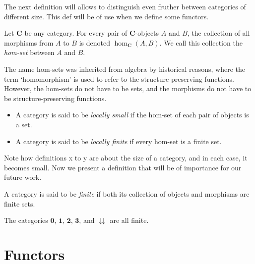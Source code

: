 The next definition will allows to distinguish even fruther between categories of different size.
This def will be of use when we define some functors.

\begin{definition}
    Let \(\mathbf{C}\) be any category.
    For every pair of \(\mathbf{C}\)-objects \(A\) and \(B\), the collection of all morphisms from \(A\) to \(B\) is denoted \(\hom_\mathbf{C}(A,B)\).
    We call this collection the  \textit{hom-set} between \(A\) and \(B\).
\end{definition}

\begin{remark}
    The name hom-sets was inherited from algebra by historical reasons, where the term `homomorphism' is used to refer to the structure preserving functions. 
    However, the hom-sets do not have to be sets, and the morphisms do not have to be structure-preserving functions.
\end{remark}

\begin{definition}
    \begin{itemize}[left=0pt]
        \item A category is said to be \textit{locally small} if the hom-set of  each pair of objects is a set.
        \item A category is said to be \textit{locally finite} if every  hom-set is a finite set.
    \end{itemize}    
\end{definition}

Note how definitions x to y are about the size of a category, and in each case, it becomes small.
Now we present a definition that will be of importance for our future work.

\begin{definition}
    A category is said to be \textit{finite} if both its collection of objects and morphisms are finite sets.
\end{definition}

\begin{example}
    The categories
    \(\mathbf{0}\), \(\mathbf{1}\), \(\mathbf{2}\), \(\mathbf{3}\), and \( \downdownarrows\) are all finite.
\end{example}


\section{Functors}

